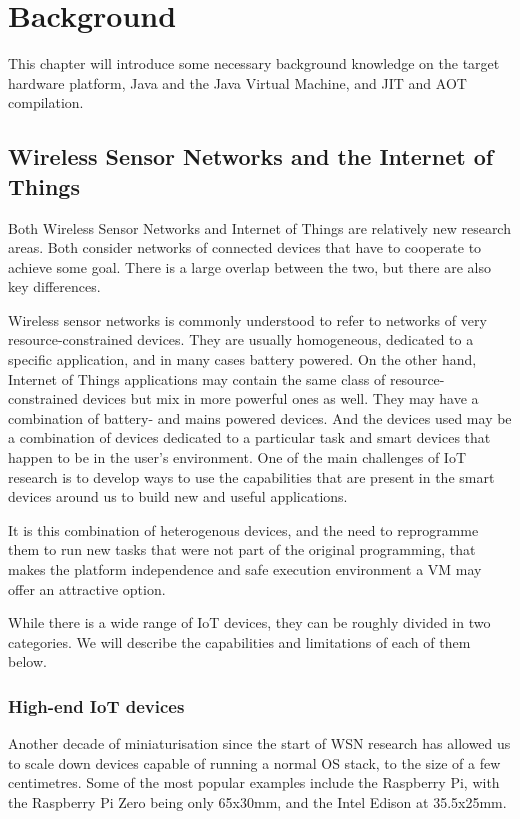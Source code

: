\chapter{Background}
This chapter will introduce some necessary background knowledge on the target hardware platform, Java and the Java Virtual Machine, and JIT and AOT compilation.

\section{Wireless Sensor Networks and the Internet of Things}
Both Wireless Sensor Networks and Internet of Things are relatively new research areas. Both consider networks of connected devices that have to cooperate to achieve some goal. There is a large overlap between the two, but there are also key differences.

Wireless sensor networks is commonly understood to refer to networks of very resource-constrained devices. They are usually homogeneous, dedicated to a specific application, and in many cases battery powered. On the other hand, Internet of Things applications may contain the same class of resource-constrained devices but mix in more powerful ones as well. They may have a combination of battery- and mains powered devices. And the devices used may be a combination of devices dedicated to a particular task and smart devices that happen to be in the user's environment. One of the main challenges of IoT research is to develop ways to use the capabilities that are present in the smart devices around us to build new and useful applications.

It is this combination of heterogenous devices, and the need to reprogramme them to run new tasks that were not part of the original programming, that makes the platform independence and safe execution environment a VM may offer an attractive option.

While there is a wide range of IoT devices, they can be roughly divided in two categories. We will describe the capabilities and limitations of each of them below. 


\subsection{High-end IoT devices}
Another decade of miniaturisation since the start of WSN research has allowed us to scale down devices capable of running a normal OS stack, to the size of a few centimetres. Some of the most popular examples include the Raspberry Pi, with the Raspberry Pi Zero being only 65x30mm, and the Intel Edison at 35.5x25mm.

